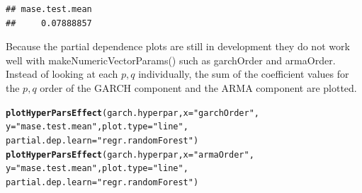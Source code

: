 \documentclass[12pt]{article}\usepackage[]{graphicx}\usepackage[]{color}
\makeatletter
\newcommand{\hlstr}[1]{\textcolor[rgb]{0.192,0.494,0.8}{#1}}%
\newcommand{\hlstd}[1]{\textcolor[rgb]{0.345,0.345,0.345}{#1}}%
\newcommand{\hlkwc}[1]{\textcolor[rgb]{0.333,0.667,0.333}{#1}}%
\newcommand{\hlkwd}[1]{\textcolor[rgb]{0.737,0.353,0.396}{\textbf{#1}}}%
\newenvironment{kframe}{%
 \def\at@end@of@kframe{}%
 \ifinner\ifhmode%
  \def\at@end@of@kframe{\end{minipage}}%
  \begin{minipage}{\columnwidth}%
 \fi\fi%
 \def\FrameCommand##1{\hskip\@totalleftmargin \hskip-\fboxsep
 \colorbox{shadecolor}{##1}\hskip-\fboxsep
     \hskip-\linewidth \hskip-\@totalleftmargin \hskip\columnwidth}%
 \MakeFramed {\advance\hsize-\width
   \@totalleftmargin\z@ \linewidth\hsize
   \@setminipage}}%
 {\par\unskip\endMakeFramed%
 \at@end@of@kframe}
\newenvironment{knitrout}{}{} %
\theoremstyle{definition}
\newcommand\code{\@codex}
\def\@codex#1{{\normalfont\ttfamily\hyphenchar\font=-1 #1}}
\makeatother
\begin{document}
\begin{knitrout}
\color{fgcolor}\begin{kframe}
\begin{verbatim}
## mase.test.mean 
##     0.07888857
\end{verbatim}
\end{kframe}
\end{knitrout}


Because the partial dependence plots are still in development they do not work well with \code{makeNumericVectorParams()} such as \code{garchOrder} and \code{armaOrder}. Instead of looking at each $p,q$ individually, the sum of the coefficient values for the $p,q$ order of the GARCH component and the ARMA component are plotted.

\singlespacing


\begin{knitrout}
\color{fgcolor}\begin{kframe}
\begin{alltt}
\hlkwd{plotHyperParsEffect}\hlstd{(garch.hyperpar,} \hlkwc{x}\hlstd{=} \hlstr{"garchOrder"}\hlstd{,}
                    \hlkwc{y} \hlstd{=} \hlstr{"mase.test.mean"}\hlstd{,} \hlkwc{plot.type} \hlstd{=} \hlstr{"line"}\hlstd{,}
                     \hlkwc{partial.dep.learn} \hlstd{=} \hlstr{"regr.randomForest"}\hlstd{)}
\hlkwd{plotHyperParsEffect}\hlstd{(garch.hyperpar,} \hlkwc{x}\hlstd{=} \hlstr{"armaOrder"}\hlstd{,}
                    \hlkwc{y} \hlstd{=} \hlstr{"mase.test.mean"}\hlstd{,} \hlkwc{plot.type} \hlstd{=} \hlstr{"line"}\hlstd{,}
                     \hlkwc{partial.dep.learn} \hlstd{=} \hlstr{"regr.randomForest"}\hlstd{)}
\end{alltt}
\end{kframe}
\end{knitrout}
\end{document}
